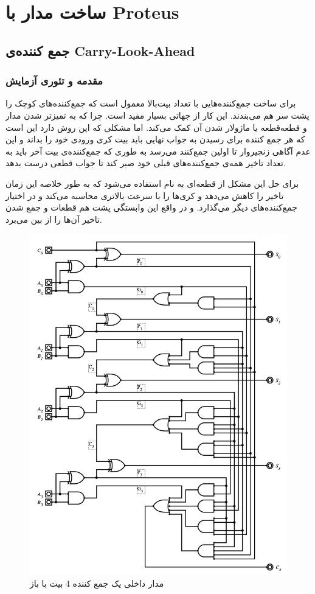 \chapter{
ساخت مدار با
Proteus
}
\section{جمع کننده‌ی Carry-Look-Ahead}
\subsection*{مقدمه و تئوری آزمایش}
برای ساخت جمع‌کننده‌هایی با تعداد بیت‌بالا معمول است که جمع‌کننده‌های کوچک را پشت سر هم می‌بندند.
این کار از جهاتی بسیار مفید است. چرا که به تمیزتر شدن مدار و قطعه‌قطعه یا ماژولار شدن آن کمک می‌کند.
اما مشکلی که این روش دارد این است که هر جمع کننده برای رسیدن به جواب نهایی باید بیت کری ورودی خود را بداند و این عدم آگاهی زنجیروار تا اولین جمع‌کنند می‌رسد به طوری که جمع‌کننده‌ی بیت آخر باید به تعداد تاخیر همه‌ی جمع‌کننده‌های قبلی خود صبر کند تا جواب قطعی درست بدهد.

برای حل این مشکل از قطعه‌ای به نام
استفاده می‌شود که به طور خلاصه این زمان تاخیر را کاهش می‌دهد و کری‌ها را با سرعت بالاتری محاسبه می‌کند و در اختیار جمع‌کننده‌های دیگر می‌گذارد. و در واقع این وابستگی پشت هم قطعات و جمع شدن تاخیر آن‌ها را از بین می‌برد.

\begin{figure}[h]
\centering
\includegraphics[scale=0.7]{Results/3.png}
\caption{
مدار داخلی یک
جمع کننده 4 بیت با
باز
}
\end{figure}

